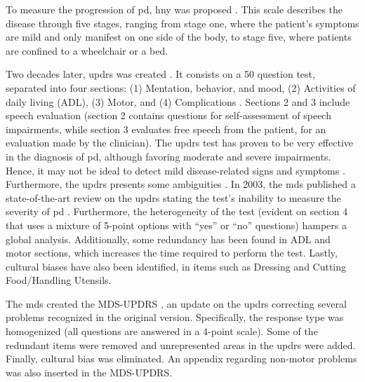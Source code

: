 To measure the progression of \gls{pd}, \gls{hny} was proposed \cite{hoehn_yahr}. This scale describes the disease through five stages, ranging from stage one, where the patient's symptoms are mild and only manifest on one side of the body, to stage five, where patients are confined to a wheelchair or a bed.

Two decades later, \gls{updrs} was created \cite{fahn_updrs}. It consists on a 50 question test, separated into four sections: (1) Mentation, behavior, and mood, (2) Activities of daily living (ADL), (3) Motor, and (4) Complications \cite{updrs}. Sections 2 and 3 include speech evaluation (section 2 contains questions for self-assessment of speech impairments, while section 3 evaluates free speech from the patient, for an evaluation made by the clinician). The \gls{updrs} test has proven to be very effective in the diagnosis of \gls{pd}, although favoring moderate and severe impairments. Hence, it may not be ideal to detect mild disease-related signs and symptoms \cite{updrs_bias}.
Furthermore, the \gls{updrs} presents some ambiguities \cite{updrs_bias}. In 2003, the \gls{mds} published a state-of-the-art review on the \gls{updrs} stating the test's inability to measure the severity of \gls{pd} \cite{mds_updrs}. Furthermore, the heterogeneity of the test (evident on section 4 that uses a mixture of 5-point options with ``yes'' or ``no'' questions) hampers a global analysis. Additionally, some redundancy has been found in ADL and motor sections, which increases the time required to perform the test. Lastly, cultural biases have also been identified, in items such as Dressing and Cutting Food/Handling Utensils.

The \gls{mds} created the MDS-UPDRS \cite{mds_updrs}, an update on the \gls{updrs} correcting several problems recognized in the original version. Specifically, the response type was homogenized (all questions are answered in a 4-point scale). Some of the redundant items were removed and unrepresented areas in the \gls{updrs} were added. Finally, cultural bias was eliminated. An appendix regarding non-motor problems was also inserted in the MDS-UPDRS.


